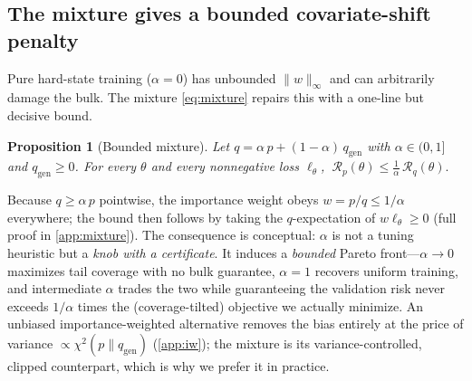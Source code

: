 \documentclass{article}
\theoremstyle{plain}
\newtheorem{proposition}{Proposition}
\theoremstyle{definition}
\theoremstyle{remark}
\newcommand{\lossf}{\ell_\theta}
\newcommand{\pnat}{p}
\newcommand{\qtr}{q}
\newcommand{\qgen}{q_{\mathrm{gen}}}
\newcommand{\Rp}{\mathcal{R}_{\pnat}}
\newcommand{\Rq}{\mathcal{R}_{\qtr}}
\newcommand{\unif}{\alpha}
\begin{document}
\subsection{The mixture gives a bounded covariate-shift penalty}\label{sec:method-mixture}
Pure hard-state training ($\unif=0$) has unbounded $\|w\|_\infty$ and can arbitrarily damage the bulk.
The mixture \eqref{eq:mixture} repairs this with a one-line but decisive bound.
\begin{proposition}[Bounded mixture]\label{prop:mixture}
Let $\qtr=\unif\,\pnat+(1-\unif)\,\qgen$ with $\unif\in(0,1]$ and $\qgen\ge 0$. For every $\theta$ and
every nonnegative loss $\lossf$, $\ \Rp(\theta)\le \tfrac{1}{\unif}\,\Rq(\theta).$
\end{proposition}
Because $\qtr\ge\unif\,\pnat$ pointwise, the importance weight obeys $w=\pnat/\qtr\le 1/\unif$ everywhere;
the bound then follows by taking the $\qtr$-expectation of $w\lossf\ge 0$ (full proof in
\cref{app:mixture}). The consequence is conceptual: $\unif$ is not a tuning heuristic but a \emph{knob
with a certificate}. It induces a \emph{bounded} Pareto front---$\unif\!\to\!0$ maximizes tail coverage
with no bulk guarantee, $\unif\!=\!1$ recovers uniform training, and intermediate $\unif$ trades the two
while guaranteeing the validation risk never exceeds $1/\unif$ times the (coverage-tilted) objective we
actually minimize. An unbiased importance-weighted alternative removes the bias entirely at the price of
variance $\propto\chi^2(\pnat\|\qgen)$ (\cref{app:iw}); the mixture is its variance-controlled, clipped
counterpart, which is why we prefer it in practice.
\end{document}
